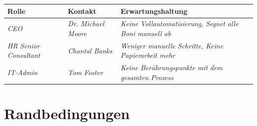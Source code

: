 \documentclass[]{article}
\begin{document}
\begin{longtable}[]{@{}lll@{}}
\toprule
\begin{minipage}[b]{0.23\columnwidth}\raggedright
Rolle\strut
\end{minipage} & \begin{minipage}[b]{0.23\columnwidth}\raggedright
Kontakt\strut
\end{minipage} & \begin{minipage}[b]{0.46\columnwidth}\raggedright
Erwartungshaltung\strut
\end{minipage}\tabularnewline
\midrule
\endhead
\begin{minipage}[t]{0.23\columnwidth}\raggedright
	\emph{CEO}\strut
\end{minipage} & \begin{minipage}[t]{0.23\columnwidth}\raggedright
\emph{Dr. Michael Moore}\strut
\end{minipage} & \begin{minipage}[t]{0.46\columnwidth}\raggedright
\emph{Keine Vollautomatisierung, Segnet alle Boni manuell ab}\strut
\end{minipage}\tabularnewline
\begin{minipage}[t]{0.23\columnwidth}\raggedright
\emph{HR Senior Consultant}\strut
\end{minipage} & \begin{minipage}[t]{0.23\columnwidth}\raggedright
\emph{Chantal Banks}\strut
\end{minipage} & \begin{minipage}[t]{0.46\columnwidth}\raggedright
\emph{Weniger manuelle Schritte, Keine Papierarbeit mehr}\strut
\end{minipage}\tabularnewline
\begin{minipage}[t]{0.23\columnwidth}\raggedright
	\emph{IT-Admin}\strut
\end{minipage} & \begin{minipage}[t]{0.23\columnwidth}\raggedright
	\emph{Tom Foster}\strut
\end{minipage} & \begin{minipage}[t]{0.46\columnwidth}\raggedright
	\emph{Keine Berührungspunkte mit dem gesamten Prozess}\strut
\end{minipage}\tabularnewline
\bottomrule
\end{longtable}


\hypertarget{section-architecture-constraints}{%
\section{Randbedingungen}\label{section-architecture-constraints}}
\end{document}
